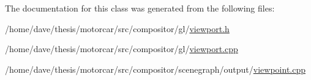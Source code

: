 The documentation for this class was generated from the following files\-:\begin{DoxyCompactItemize}
\item 
/home/dave/thesis/motorcar/src/compositor/gl/\hyperlink{viewport_8h}{viewport.\-h}\item 
/home/dave/thesis/motorcar/src/compositor/gl/\hyperlink{viewport_8cpp}{viewport.\-cpp}\item 
/home/dave/thesis/motorcar/src/compositor/scenegraph/output/\hyperlink{viewpoint_8cpp}{viewpoint.\-cpp}\end{DoxyCompactItemize}
